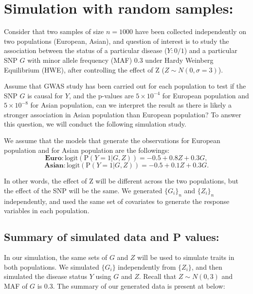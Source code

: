 \documentclass[
]{article}
\begin{document}
\clearpage

\hypertarget{simulation-with-random-samples}{%
\section{Simulation with random
samples:}\label{simulation-with-random-samples}}

Consider that two samples of size \(n=1000\) have been collected
independently on two populations (European, Asian), and question of
interest is to study the association between the status of a particular
disease (\(Y:0/1\)) and a particular SNP \(G\) with minor allele
frequency (MAF) \(0.3\) under Hardy Weinberg Equilibrium (HWE), after
controlling the effect of Z (\(Z\sim N(0,\sigma=3)\)).

Assume that GWAS study has been carried out for each population to test
if the SNP \(G\) is causal for \(Y\), and the p-values are
\(5\times10^{-4}\) for European population and \(5 \times 10^{-8}\) for
Asian population, can we interpret the result as there is likely a
stronger association in Asian population than European population? To
answer this question, we will conduct the following simulation study.

We assume that the models that generate the observations for European
population and for Asian population are the followings:
\[\textbf{Euro}:\text{logit}(\text{P}(Y=1|G,Z)) = -0.5 + 0.8Z + 0.3G,\]
\[\textbf{Asian}: \text{logit}(\text{P}(Y=1|G,Z)) = -0.5 + 0.1Z + 0.3G.\]

In other words, the effect of Z will be different across the two
populations, but the effect of the SNP will be the same. We generated
\(\{G_i\}_n\) and \(\{Z_i\}_n\) independently, and used the same set of
covariates to generate the response variables in each population.

\hypertarget{summary-of-simulated-data-and-p-values}{%
\subsection{Summary of simulated data and P
values:}\label{summary-of-simulated-data-and-p-values}}

In our simulation, the same sets of \(G\) and \(Z\) will be used to
simulate traits in both populations. We simulated \(\{G_i\}\)
independently from \(\{Z_i\}\), and then simulated the disease status
\(Y\) using \(G\) and \(Z\). Recall that \(Z \sim N(0,3)\) and MAF of
\(G\) is 0.3. The summary of our generated data is present at below:
\end{document}

